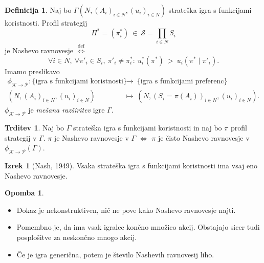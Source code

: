 \documentclass[11pt]{article}
\renewcommand{\S}{\mathscr{S}}
\newcommand{\diff}{\overset{\text{def}}{\iff}}
\newcommand{\set}[1]{\{#1\}}
\newcommand{\1}{\mathbbm{1}}
\theoremstyle{definition}
\newtheorem{definicija}{Definicija}[section]
\theoremstyle{definition}
\newtheorem{trditev}{Trditev}[section]
\theoremstyle{definition}
\newtheorem{izrek}{Izrek}[section]
\theoremstyle{definition}
\newtheorem*{opomba}{Opomba}
\begin{document}
\begin{definicija}

Naj bo $\Gamma(N, (A_i)_{i \in N}, (u_i)_{i \in N})$ strateška igra s funkcijami koristnosti. Profil strategij 
$$\Pi^* = (\pi_i^*) ~\in~ \S = \prod_{i \in N} S_i$$
je Nashevo ravnovesje $\diff$
$$\forall i \in N, ~\forall \pi'_i \in S_i, ~\pi'_i \neq \pi_i^*: ~u_i^*(\pi^*) ~>~ u_i(\pi^* \mid \pi'_i).$$
Imamo preslikavo
\begin{align*}
\phi_{\mathscr{K} \rightarrow \mathscr{P}}: \set{\text{igra s funkcijami koristnosti}} ~&\rightarrow~ \set{\text{igra s funkcijami preferenc}} \\
(N, (A_i)_{i \in N}, (u_i)_{i \in N}) ~&\mapsto~ (N, (S_i = \pi(A_i))_{i \in N}, (u_i)_{i \in N}).
\end{align*}
$\phi_{\mathscr{K} \rightarrow \mathscr{P}}$ je \textit{mešana razširitev} igre $\Gamma$.

\end{definicija}
\vspace{0.5cm}

\begin{trditev}

Naj bo $\Gamma$ strateška igra s funkcijami koristnosti in naj bo $\pi$ profil strategij v $\Gamma$. $\pi$ je Nashevo ravnovesje v $\Gamma$ $\iff$ $\pi$ je čisto Nashevo ravnovesje v $\phi_{\mathscr{K} \rightarrow \mathscr{P}}(\Gamma)$.

\end{trditev}
\vspace{0.5cm}

\begin{izrek}[Nash, 1949]

Vsaka strateška igra s funkcijami koristnosti ima vsaj eno Nashevo ravnovesje.

\end{izrek}
\vspace{0.5cm}

\begin{opomba}
~
\begin{itemize}
	\item Dokaz je nekonstruktiven, nič ne pove kako Nashevo ravnovesje najti.
	\item Pomembno je, da ima vsak igralec končno množico akcij. Obstajajo sicer tudi posplošitve za neskončno mnogo akcij.
	\item Če je igra generična, potem je število Nashevih ravnovesij liho.
\end{itemize}

\end{opomba}
\vspace{0.5cm}
\end{document}

